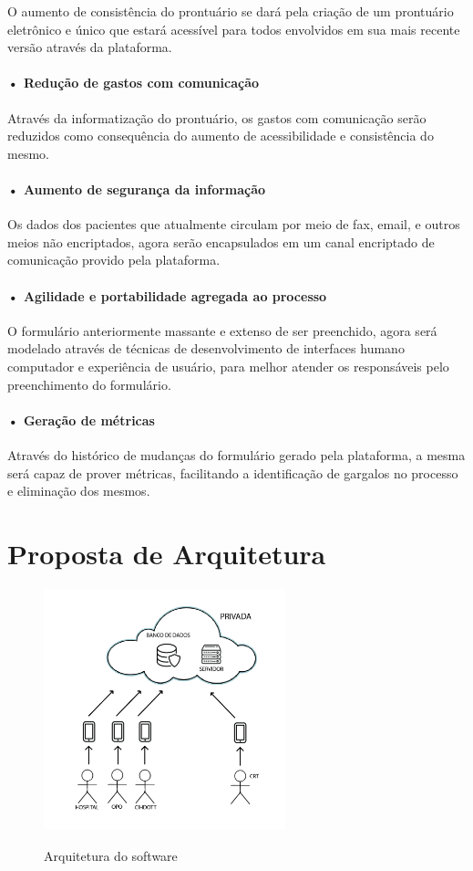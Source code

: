 \documentclass[portuguese,oneside]{tcc}
\begin{document}
O aumento de consistência do prontuário se dará pela criação de um prontuário eletrônico e único que estará acessível para todos envolvidos em sua mais recente versão através da plataforma.

\paragraph*{• Redução de gastos com comunicação}

Através da informatização do prontuário, os gastos com comunicação serão reduzidos como consequência do aumento de acessibilidade e consistência do mesmo.

\paragraph*{• Aumento de segurança da informação}

Os dados dos pacientes que atualmente circulam por meio de fax, email, e outros meios não encriptados, agora serão encapsulados em um canal encriptado de comunicação provido pela plataforma.

\paragraph*{• Agilidade e portabilidade agregada ao processo}

O formulário anteriormente massante e extenso de ser preenchido, agora será modelado através de técnicas de desenvolvimento de interfaces humano computador e experiência de usuário, para melhor atender os responsáveis pelo preenchimento do formulário.

\paragraph*{• Geração de métricas}

Através do histórico de mudanças do formulário gerado pela plataforma, a mesma será capaz de prover métricas, facilitando a identificação de gargalos no processo e eliminação dos mesmos.

\section{Proposta de Arquitetura}

\begin{figure}[htp]
\centering
\caption{Arquitetura do software}
\includegraphics[width=7cm]{cliente-servidor}
\label{fig:cliente-servidor}
\end{figure}
\end{document}
